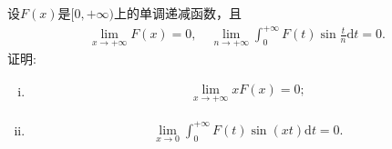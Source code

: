 \documentclass[../../main.tex]{subfiles}
\begin{document}
\begin{example}
设$F(x)$是$[0,+\infty)$上的单调递减函数，且
\begin{align}
\lim\limits_{x \to +\infty} F(x) = 0,\quad
\lim\limits_{n \to +\infty} \int_0^{+\infty} F(t) \sin \frac{t}{n} \mathrm{d}t = 0.\label{eq::23945789023589028225}
\end{align}
证明:
\begin{enumerate}[(i)]
\item \begin{align}
\lim\limits_{x \to +\infty} xF(x) = 0;\label{eq::23945789023589028226}
\end{align}

\item \begin{align}
\lim\limits_{x \to 0} \int_0^{+\infty} F(t) \sin(xt) \mathrm{d}t = 0.\label{eq::23945789023589028227}
\end{align}
\end{enumerate}
\end{example}
\end{document}
